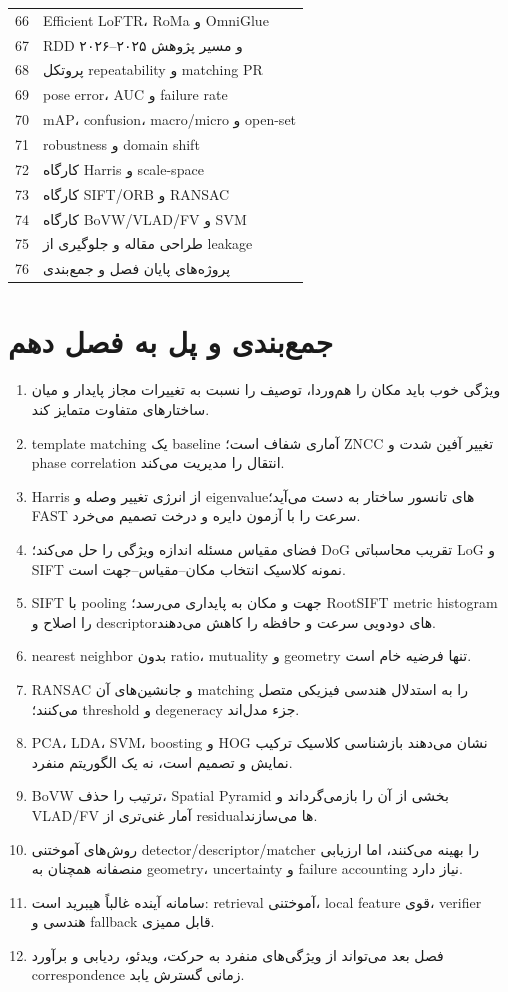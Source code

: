 \documentclass[12pt,openany,oneside]{book}
\begin{document}
\begin{longtable}{p{12mm}p{116mm}}
66 & Efficient LoFTR، RoMa و OmniGlue \\
67 & RDD و مسیر پژوهش ۲۰۲۵--۲۰۲۶ \\
68 & پروتکل repeatability و matching PR \\
69 & pose error، AUC و failure rate \\
70 & mAP، confusion، macro/micro و open-set \\
71 & robustness و domain shift \\
72 & کارگاه Harris و scale-space \\
73 & کارگاه SIFT/ORB و RANSAC \\
74 & کارگاه BoVW/VLAD/FV و SVM \\
75 & طراحی مقاله و جلوگیری از leakage \\
76 & پروژه‌های پایان فصل و جمع‌بندی \\
\bottomrule
\end{longtable}

\section{جمع‌بندی و پل به فصل دهم}
\begin{summarybox}
\begin{enumerate}
\item ویژگی خوب باید مکان را هم‌وردا، توصیف را نسبت به تغییرات مجاز پایدار و میان ساختارهای متفاوت متمایز کند.
\item template matching یک baseline آماری شفاف است؛ ZNCC تغییر آفین شدت و phase correlation انتقال را مدیریت می‌کند.
\item Harris از انرژی تغییر وصله و eigenvalueهای تانسور ساختار به دست می‌آید؛ FAST سرعت را با آزمون دایره و درخت تصمیم می‌خرد.
\item فضای مقیاس مسئله اندازه ویژگی را حل می‌کند؛ DoG تقریب محاسباتی LoG و SIFT نمونه کلاسیک انتخاب مکان--مقیاس--جهت است.
\item SIFT با pooling جهت و مکان به پایداری می‌رسد؛ RootSIFT metric histogram را اصلاح و descriptorهای دودویی سرعت و حافظه را کاهش می‌دهند.
\item nearest neighbor بدون ratio، mutuality و geometry تنها فرضیه خام است.
\item RANSAC و جانشین‌های آن matching را به استدلال هندسی فیزیکی متصل می‌کنند؛ threshold و degeneracy جزء مدل‌اند.
\item PCA، LDA، SVM، boosting و HOG نشان می‌دهند بازشناسی کلاسیک ترکیب نمایش و تصمیم است، نه یک الگوریتم منفرد.
\item BoVW ترتیب را حذف، Spatial Pyramid بخشی از آن را بازمی‌گرداند و VLAD/FV آمار غنی‌تری از residualها می‌سازند.
\item روش‌های آموختنی detector/descriptor/matcher را بهینه می‌کنند، اما ارزیابی منصفانه همچنان به geometry، uncertainty و failure accounting نیاز دارد.
\item سامانه آینده غالباً هیبرید است: retrieval آموختنی، local feature قوی، verifier هندسی و fallback قابل ممیزی.
\item فصل بعد می‌تواند از ویژگی‌های منفرد به حرکت، ویدئو، ردیابی و برآورد correspondence زمانی گسترش یابد.
\end{enumerate}
\end{summarybox}
\end{document}
